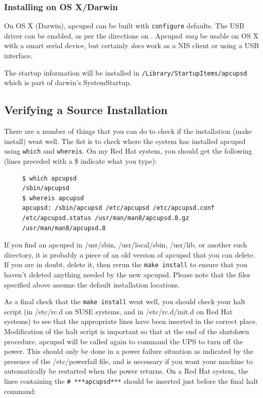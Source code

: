 \label{Installing-on-OSX}
\subsubsection*{Installing on OS X/Darwin}

On OS X (Darwin), apcupsd can be built with \texttt{configure} defaults.
The USB driver can be enabled, as per the directions on
.
Apcupsd \emph{may} be usable on OS X with a smart serial device, but
certainly \emph{does} work as a NIS client or using a USB interface.

The startup information will be installed in
\texttt{/Library/StartupItems/apcupsd} which is part of darwin's
SystemStartup.


\label{Verifying-a-Source-Installation}

\subsection*{Verifying a Source Installation}

\label{index-Verifying-Source-22}
\label{index-Installing_002c-Source-23}
There are a number of things that you can do to check if the installation
(make install) went well. The fist is to check where the system has installed
apcupsd using {\tt which} and {\tt whereis}. On my Red Hat system, you should
get the following (lines preceded with a \$ indicate what you type): 

\footnotesize
\begin{verbatim}
     $ which apcupsd
     /sbin/apcupsd
     $ whereis apcupsd
     apcupsd: /sbin/apcupsd /etc/apcupsd /etc/apcupsd.conf
     /etc/apcupsd.status /usr/man/man8/apcupsd.8.gz
     /usr/man/man8/apcupsd.8
\end{verbatim}
\normalsize

If you find an apcupsd in /usr/sbin, /usr/local/sbin, /usr/lib, or another
such directory, it is probably a piece of an old version of apcupsd that you
can delete. If you are in doubt, delete it, then rerun the {\tt make install}
to ensure that you haven't deleted anything needed by the new apcupsd.  Please
note that the files specified above assume the default installation locations.
 

As a final check that the {\tt make install} went well, you should check your
halt script (in /etc/rc.d on SUSE systems, and in /etc/rc.d/init.d on Red Hat
systems) to see that the appropriate lines have been inserted in the correct
place. Modification of the halt script is important so that at the end of the
shutdown procedure, apcupsd will be called again to command the UPS to turn
off the power. This should only be done in a power failure situation as
indicated by the presence of the /etc/powerfail file, and is necessary if you
want your machine to automatically be restarted when the power returns. On a
Red Hat system, the lines containing the {\tt \# ***apcupsd***} should be
inserted just before the final halt command: 

